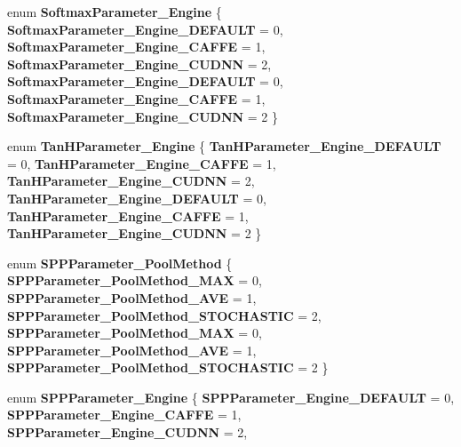 \begin{DoxyCompactItemize}
enum {\bfseries Softmax\+Parameter\+\_\+\+Engine} \{ \newline
{\bfseries Softmax\+Parameter\+\_\+\+Engine\+\_\+\+D\+E\+F\+A\+U\+LT} = 0, 
{\bfseries Softmax\+Parameter\+\_\+\+Engine\+\_\+\+C\+A\+F\+FE} = 1, 
{\bfseries Softmax\+Parameter\+\_\+\+Engine\+\_\+\+C\+U\+D\+NN} = 2, 
{\bfseries Softmax\+Parameter\+\_\+\+Engine\+\_\+\+D\+E\+F\+A\+U\+LT} = 0, 
\newline
{\bfseries Softmax\+Parameter\+\_\+\+Engine\+\_\+\+C\+A\+F\+FE} = 1, 
{\bfseries Softmax\+Parameter\+\_\+\+Engine\+\_\+\+C\+U\+D\+NN} = 2
 \}
\item 
\mbox{\label{namespacecaffe_a08dbc063577092934d71154a2d550988}} 
enum {\bfseries Tan\+H\+Parameter\+\_\+\+Engine} \{ \newline
{\bfseries Tan\+H\+Parameter\+\_\+\+Engine\+\_\+\+D\+E\+F\+A\+U\+LT} = 0, 
{\bfseries Tan\+H\+Parameter\+\_\+\+Engine\+\_\+\+C\+A\+F\+FE} = 1, 
{\bfseries Tan\+H\+Parameter\+\_\+\+Engine\+\_\+\+C\+U\+D\+NN} = 2, 
{\bfseries Tan\+H\+Parameter\+\_\+\+Engine\+\_\+\+D\+E\+F\+A\+U\+LT} = 0, 
\newline
{\bfseries Tan\+H\+Parameter\+\_\+\+Engine\+\_\+\+C\+A\+F\+FE} = 1, 
{\bfseries Tan\+H\+Parameter\+\_\+\+Engine\+\_\+\+C\+U\+D\+NN} = 2
 \}
\item 
\mbox{\label{namespacecaffe_a781e4d743df0487fd72d5fda2ce2bf6f}} 
enum {\bfseries S\+P\+P\+Parameter\+\_\+\+Pool\+Method} \{ \newline
{\bfseries S\+P\+P\+Parameter\+\_\+\+Pool\+Method\+\_\+\+M\+AX} = 0, 
{\bfseries S\+P\+P\+Parameter\+\_\+\+Pool\+Method\+\_\+\+A\+VE} = 1, 
{\bfseries S\+P\+P\+Parameter\+\_\+\+Pool\+Method\+\_\+\+S\+T\+O\+C\+H\+A\+S\+T\+IC} = 2, 
{\bfseries S\+P\+P\+Parameter\+\_\+\+Pool\+Method\+\_\+\+M\+AX} = 0, 
\newline
{\bfseries S\+P\+P\+Parameter\+\_\+\+Pool\+Method\+\_\+\+A\+VE} = 1, 
{\bfseries S\+P\+P\+Parameter\+\_\+\+Pool\+Method\+\_\+\+S\+T\+O\+C\+H\+A\+S\+T\+IC} = 2
 \}
\item 
\mbox{\label{namespacecaffe_a95c698e6a9e3a7f5577ac7be993b4589}} 
enum {\bfseries S\+P\+P\+Parameter\+\_\+\+Engine} \{ \newline
{\bfseries S\+P\+P\+Parameter\+\_\+\+Engine\+\_\+\+D\+E\+F\+A\+U\+LT} = 0, 
{\bfseries S\+P\+P\+Parameter\+\_\+\+Engine\+\_\+\+C\+A\+F\+FE} = 1, 
{\bfseries S\+P\+P\+Parameter\+\_\+\+Engine\+\_\+\+C\+U\+D\+NN} = 2, 

\end{DoxyCompactItemize}
